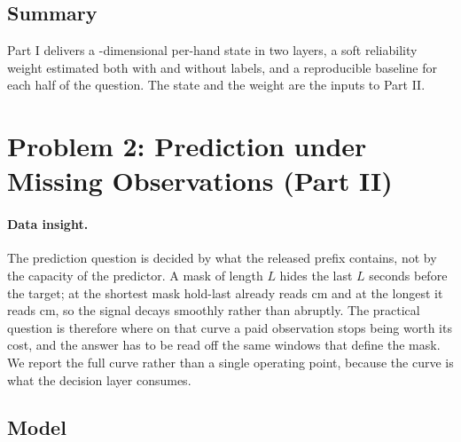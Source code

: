 \documentclass{swmcmthesis}
\begin{document}
\subsection{Summary}

Part I delivers a \slotDataStateDim{}-dimensional per-hand state in two layers, a
soft reliability weight estimated both with and without labels, and a
reproducible baseline for each half of the question. The state and the weight are
the inputs to Part II.

\section{Problem 2: Prediction under Missing Observations (Part II)}
\label{sec:parttwo}

\paragraph{Data insight.} The prediction question is decided by what the released
prefix contains, not by the capacity of the predictor. A mask of length $L$ hides the
last $L$ seconds before the target; at the shortest mask hold-last already reads
\slotPTwoARidgeRMSE{} cm and at the longest it reads \slotPTwoCHoldRMSE{} cm, so the
signal decays smoothly rather than abruptly. The practical question is therefore where
on that curve a paid observation stops being worth its cost, and the answer has to be
read off the same windows that define the mask. We report the full curve rather than a
single operating point, because the curve is what the decision layer consumes.

\subsection{Model}
\label{sec:p2model}
\end{document}
